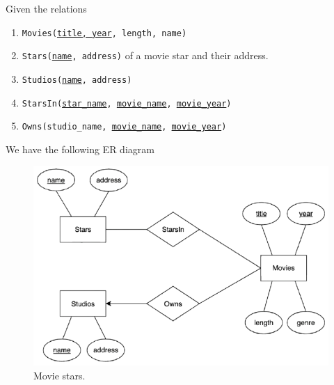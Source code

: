 \documentclass{article}
\begin{document}
      \begin{example}
        Given the relations 
        \begin{enumerate}
          \item \texttt{Movies(\underline{title, year}, length, name)}
          \item \texttt{Stars(\underline{name}, address)} of a movie star and their address. 
          \item \texttt{Studios(\underline{name}, address)} 
          \item \texttt{StarsIn(\underline{star\_name}, \underline{movie\_name}, \underline{movie\_year})} 
          \item \texttt{Owns(studio\_name, \underline{movie\_name}, \underline{movie\_year})}
        \end{enumerate}
        We have the following ER diagram 
        \begin{figure}[H]
          \centering 
          \includegraphics[scale=0.3]{img/movie_stars.png}
          \caption{Movie stars. } 
          \label{fig:movie_stars}
        \end{figure}
      \end{example}
\end{document}
